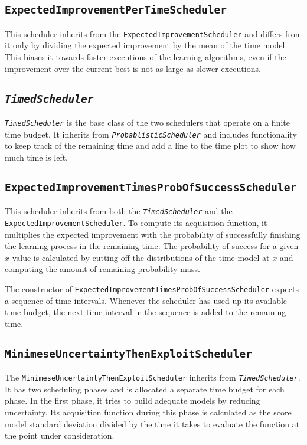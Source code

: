 \documentclass[a4paper,12pt,twoside,openright]{report}
\begin{document}
\subsection{\texttt{ExpectedImprovementPerTimeScheduler}}
This scheduler inherits from the \texttt{ExpectedImprovementScheduler} and differs from it only by dividing the expected improvement by the mean of the time model. This biases it towards faster executions of the learning algorithms, even if the improvement over the current best is not as large as slower executions.

\subsection{\texttt{\textit{TimedScheduler}}}
\texttt{\textit{TimedScheduler}} is the base class of the two schedulers that operate on a finite time budget. It inherits from \texttt{\textit{ProbablisticScheduler}} and includes functionality to keep track of the remaining time and add a line to the time plot to show how much time is left.

\subsection{\texttt{ExpectedImprovementTimesProbOfSuccessScheduler}}
This scheduler inherits from both the \texttt{\textit{TimedScheduler}} and the \texttt{ExpectedImprovementScheduler}. To compute its acquisition function, it multiplies the expected improvement with the probability of successfully finishing the learning process in the remaining time. The probability of success for a given $x$ value is calculated by cutting off the distributions of the time model at $x$ and computing the amount of remaining probability mass.

The constructor of \texttt{ExpectedImprovementTimesProbOfSuccessScheduler} expects a sequence of time intervals. Whenever the scheduler has used up its available time budget, the next time interval in the sequence is added to the remaining time.

\subsection{\texttt{MinimeseUncertaintyThenExploitScheduler}}
The \texttt{MinimeseUncertaintyThenExploitScheduler} inherits from \texttt{\textit{TimedScheduler}}. It has two scheduling phases and is allocated a separate time budget for each phase. In the first phase, it tries to build adequate models by reducing uncertainty. Its acquisition function during this phase is calculated as the score model standard deviation divided by the time it takes to evaluate the function at the point under consideration.%
\end{document}
